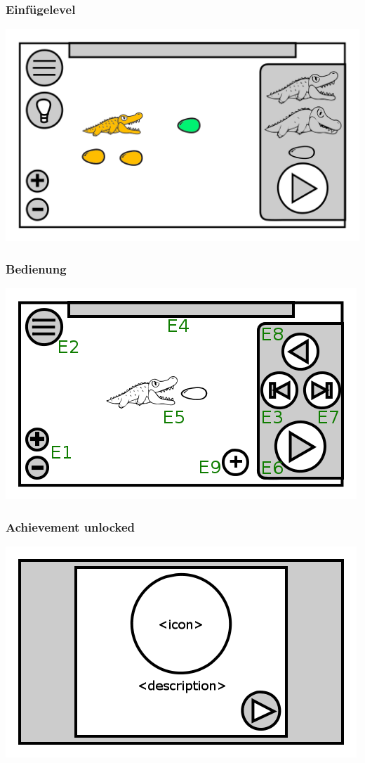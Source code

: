 \documentclass[t]{beamer}
\begin{document}
\begin{frame}
	\frametitle{Einfügelevel}
	\includegraphics[height=\textheight]{level_colored_croc2.png}
\end{frame}
\begin{frame}
	\frametitle{Bedienung}
	\includegraphics[height=\textheight]{level_simulation.png}
\end{frame}
\begin{frame}
	\frametitle{Achievement unlocked}
	\includegraphics[height=\textheight]{achievement_notification.png}
\end{frame}
\end{document}
